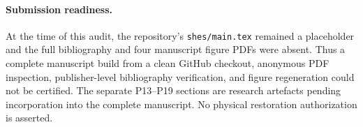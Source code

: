 \paragraph{Submission readiness.}
At the time of this audit, the repository's \texttt{shes/main.tex} remained a placeholder and the full bibliography and four manuscript figure PDFs were absent. Thus a complete manuscript build from a clean GitHub checkout, anonymous PDF inspection, publisher-level bibliography verification, and figure regeneration could not be certified. The separate P13--P19 sections are research artefacts pending incorporation into the complete manuscript. No physical restoration authorization is asserted.